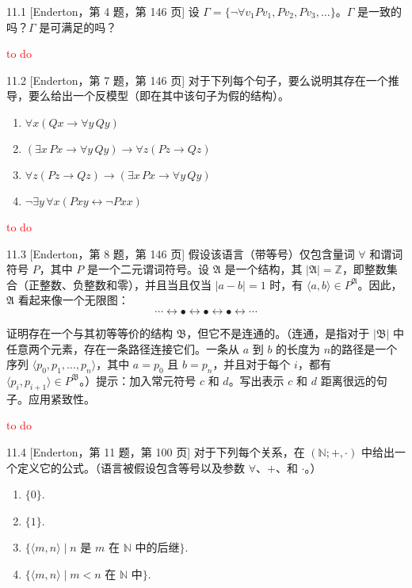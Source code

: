 
\begin{exercise}{11.1}
  [Enderton，第 4 题，第 146 页]
  设 $\Gamma=\{\neg\forall v_1 P v_1, Pv_2, Pv_3,\dots\}$。$\Gamma$ 是一致的吗？$\Gamma$ 是可满足的吗？
\end{exercise}

\textcolor{red}{to do}

\begin{exercise}{11.2}
  [Enderton，第 7 题，第 146 页]
  对于下列每个句子，要么说明其存在一个推导，要么给出一个反模型（即在其中该句子为假的结构）。
  \begin{enumerate}[label=(\alph*)]
    \item $\forall x (Qx \rightarrow \forall y \, Qy)$
    \item $(\exists x \, Px \rightarrow \forall y \, Qy) \rightarrow \forall z (Pz \rightarrow Qz)$
    \item $\forall z (Pz \rightarrow Qz) \rightarrow (\exists x \, Px \rightarrow \forall y \, Qy)$
    \item $\neg \exists y \, \forall x (Pxy \leftrightarrow \neg Pxx)$\qedhere
  \end{enumerate}
\end{exercise}

\textcolor{red}{to do}

\begin{exercise}{11.3}
  [Enderton，第 8 题，第 146 页]
  假设该语言（带等号）仅包含量词 $\forall$ 和谓词符号 $P$，其中 $P$ 是一个二元谓词符号。设 $\mathfrak{A}$ 是一个结构，其 $|\mathfrak{A}| = \mathbb{Z}$，即整数集合（正整数、负整数和零），并且当且仅当 $|a - b| = 1$ 时，有 $\langle a, b \rangle \in P^{\mathfrak{A}}$。因此，$\mathfrak{A}$ 看起来像一个无限图：
  \[
    \cdots \longleftrightarrow \bullet \longleftrightarrow \bullet \longleftrightarrow \bullet \longleftrightarrow \cdots
  \]

  证明存在一个与其初等等价的结构 $\mathfrak{B}$，但它不是连通的。（连通，是指对于 $|\mathfrak{B}|$ 中任意两个元素，存在一条路径连接它们。一条从 $a$ 到 $b$ 的长度为 $n$的路径是一个序列 $\langle p_0, p_1, \ldots, p_n \rangle$，其中 $a = p_0$ 且 $b = p_n$，并且对于每个 $i$，都有 $\langle p_i, p_{i+1} \rangle \in P^{\mathfrak{B}}$。）提示：加入常元符号 $c$ 和 $d$。写出表示 $c$ 和 $d$ 距离很远的句子。应用紧致性。
\end{exercise}

\textcolor{red}{to do}

\begin{exercise}{11.4}
  [Enderton，第 11 题，第 100 页]
  对于下列每个关系，在 \((\mathbb{N}; +, \cdot)\) 中给出一个定义它的公式。（语言被假设包含等号以及参数 \(\forall\)、\(+\)、和 \(\cdot\)。）
  \begin{enumerate}
    \item \(\{0\}\).
    \item \(\{1\}\).
    \item \(\{ \langle m, n \rangle \mid n \text{ 是 } m \text{ 在 } \mathbb{N} \text{ 中的后继} \}\).
    \item \(\{ \langle m, n \rangle \mid m < n \text{ 在 } \mathbb{N} \text{ 中} \}\).\qedhere
  \end{enumerate}
\end{exercise}

